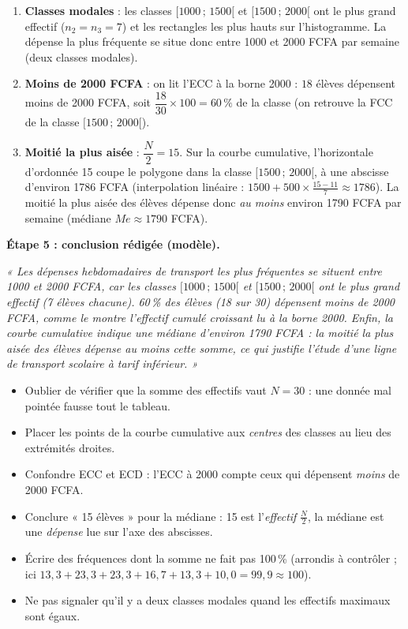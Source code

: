 \documentclass[11pt]{article}
\begin{document}
\begin{exoresolu}
\begin{enumerate}
\item \textbf{Classes modales} : les classes $[1000\,;\,1500[$ et $[1500\,;\,2000[$ ont le plus grand effectif ($n_2 = n_3 = 7$) et les rectangles les plus hauts sur l'histogramme. La dépense la plus fréquente se situe donc entre 1000 et 2000 FCFA par semaine (deux classes modales).
\item \textbf{Moins de 2000 FCFA} : on lit l'ECC à la borne 2000 : $18$ élèves dépensent moins de 2000 FCFA, soit $\dfrac{18}{30}\times 100 = 60\,\%$ de la classe (on retrouve la FCC de la classe $[1500\,;\,2000[$).
\item \textbf{Moitié la plus aisée} : $\dfrac{N}{2} = 15$. Sur la courbe cumulative, l'horizontale d'ordonnée 15 coupe le polygone dans la classe $[1500\,;\,2000[$, à une abscisse d'environ 1786 FCFA (interpolation linéaire : $1500 + 500 \times \frac{15-11}{7} \approx 1786$). La moitié la plus aisée des élèves dépense donc \emph{au moins} environ 1790 FCFA par semaine (médiane $Me \approx 1790$ FCFA).
\end{enumerate}

\textbf{Étape 5 : conclusion rédigée (modèle).}

\emph{« Les dépenses hebdomadaires de transport les plus fréquentes se situent entre 1000 et 2000 FCFA, car les classes $[1000\,;\,1500[$ et $[1500\,;\,2000[$ ont le plus grand effectif (7 élèves chacune). 60\,\% des élèves (18 sur 30) dépensent moins de 2000 FCFA, comme le montre l'effectif cumulé croissant lu à la borne 2000. Enfin, la courbe cumulative indique une médiane d'environ 1790 FCFA : la moitié la plus aisée des élèves dépense au moins cette somme, ce qui justifie l'étude d'une ligne de transport scolaire à tarif inférieur. »}
\end{exoresolu}

\begin{attention}
\begin{itemize}
\item Oublier de vérifier que la somme des effectifs vaut $N = 30$ : une donnée mal pointée fausse tout le tableau.
\item Placer les points de la courbe cumulative aux \emph{centres} des classes au lieu des extrémités droites.
\item Confondre ECC et ECD : l'ECC à 2000 compte ceux qui dépensent \emph{moins} de 2000 FCFA.
\item Conclure « 15 élèves » pour la médiane : 15 est l'\emph{effectif} $\frac{N}{2}$, la médiane est une \emph{dépense} lue sur l'axe des abscisses.
\item Écrire des fréquences dont la somme ne fait pas 100\,\% (arrondis à contrôler ; ici $13,3+23,3+23,3+16,7+13,3+10,0 = 99,9 \approx 100$).
\item Ne pas signaler qu'il y a deux classes modales quand les effectifs maximaux sont égaux.
\end{itemize}
\end{attention}
\end{document}
